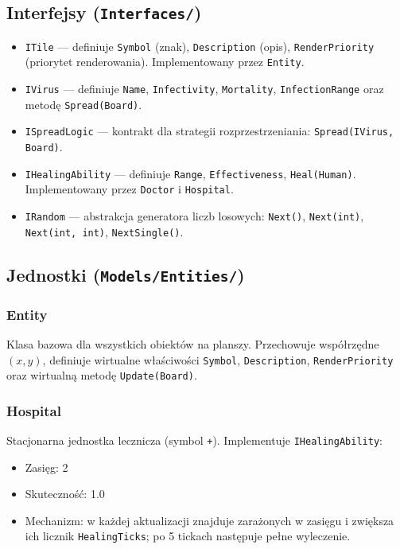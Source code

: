 \documentclass[a4paper,12pt]{article}
\begin{document}
\subsection{Interfejsy (\texttt{Interfaces/})}

\begin{itemize}
    \item \texttt{ITile} --- definiuje \texttt{Symbol} (znak), \texttt{Description} (opis),
          \texttt{RenderPriority} (priorytet renderowania). Implementowany przez \texttt{Entity}.
    \item \texttt{IVirus} --- definiuje \texttt{Name}, \texttt{Infectivity}, \texttt{Mortality},
          \texttt{InfectionRange} oraz metodę \texttt{Spread(Board)}.
    \item \texttt{ISpreadLogic} --- kontrakt dla strategii rozprzestrzeniania: \texttt{Spread(IVirus, Board)}.
    \item \texttt{IHealingAbility} --- definiuje \texttt{Range}, \texttt{Effectiveness},
          \texttt{Heal(Human)}. Implementowany przez \texttt{Doctor} i \texttt{Hospital}.
    \item \texttt{IRandom} --- abstrakcja generatora liczb losowych: \texttt{Next()},
          \texttt{Next(int)}, \texttt{Next(int, int)}, \texttt{NextSingle()}.
\end{itemize}

\subsection{Jednostki (\texttt{Models/Entities/})}

\subsubsection{Entity}

Klasa bazowa dla wszystkich obiektów na planszy. Przechowuje współrzędne $(x, y)$,
definiuje wirtualne właściwości \texttt{Symbol}, \texttt{Description}, \texttt{RenderPriority}
oraz wirtualną metodę \texttt{Update(Board)}.

\subsubsection{Hospital}

Stacjonarna jednostka lecznicza (symbol \texttt{+}). Implementuje \texttt{IHealingAbility}:
\begin{itemize}
    \item Zasięg: 2
    \item Skuteczność: 1.0
    \item Mechanizm: w każdej aktualizacji znajduje zarażonych w zasięgu i zwiększa
          ich licznik \texttt{HealingTicks}; po 5 tickach następuje pełne wyleczenie.
\end{itemize}
\end{document}

